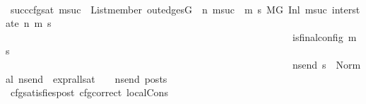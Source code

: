 \begin{isabellebody}
\isanewline
\ \ \ \ \ \ \ \ \ \ \ \ \ \ \ \ \isamarkupfalse%
\ succ{\isacharunderscore}{\kern0pt}cfg{\isacharunderscore}{\kern0pt}sat{\isacharcolon}{\kern0pt}\ {\isachardoublequoteopen}{\isacharparenleft}{\kern0pt}{\isasymforall}msuc{}{\isachardot}{\kern0pt}\ \ List{\isachardot}{\kern0pt}member\ {\isacharparenleft}{\kern0pt}out{\isacharunderscore}{\kern0pt}edges{\isacharparenleft}{\kern0pt}G{\isacharparenright}{\kern0pt}\ {\isacharbang}{\kern0pt}\ n{\isacharparenright}{\kern0pt}\ msuc{}\ {\isasymlongrightarrow}\ {\isacharparenleft}{\kern0pt}{\isasymforall}m{\isacharprime}{\kern0pt}\ s{\isacharprime}{\kern0pt}{\isachardot}{\kern0pt}\ {\isacharparenleft}{\kern0pt}{\isacharparenleft}{\kern0pt}M{\isacharcomma}{\kern0pt}{\isasymLambda}{\isacharcomma}{\kern0pt}{\isasymGamma}{\isacharcomma}{\kern0pt}{\isasymOmega}{\isacharcomma}{\kern0pt}G\ {\isasymturnstile}{\isacharparenleft}{\kern0pt}Inl\ {\isacharparenleft}{\kern0pt}msuc{}{\isacharparenright}{\kern0pt}{\isacharcomma}{\kern0pt}\ inter{\isacharunderscore}{\kern0pt}state{\isacharparenright}{\kern0pt}\ {\isacharminus}{\kern0pt}n{\isasymrightarrow}{\isacharasterisk}{\kern0pt}\ {\isacharparenleft}{\kern0pt}m{\isacharprime}{\kern0pt}{\isacharcomma}{\kern0pt}\ s{\isacharprime}{\kern0pt}{\isacharparenright}{\kern0pt}{\isacharparenright}{\kern0pt}\ {\isasymlongrightarrow}\isanewline
\ \ \ \ \ \ \ \ \ \ \ \ \ \ \ \ \ \ \ \ \ \ \ \ \ \ \ \ \ \ \ \ \ \ \ \ \ \ \ \ \ \ \ \ \ \ \ \ \ \ \ \ \ \ \ \ \ \ is{\isacharunderscore}{\kern0pt}final{\isacharunderscore}{\kern0pt}config\ {\isacharparenleft}{\kern0pt}m{\isacharprime}{\kern0pt}{\isacharcomma}{\kern0pt}\ s{\isacharprime}{\kern0pt}{\isacharparenright}{\kern0pt}\ {\isasymlongrightarrow}\ \isanewline
\ \ \ \ \ \ \ \ \ \ \ \ \ \ \ \ \ \ \ \ \ \ \ \ \ \ \ \ \ \ \ \ \ \ \ \ \ \ \ \ \ \ \ \ \ \ \ \ \ \ \ \ \ \ \ \ \ \ {\isacharparenleft}{\kern0pt}{\isasymforall}ns{\isacharunderscore}{\kern0pt}end{\isachardot}{\kern0pt}\ s{\isacharprime}{\kern0pt}\ {\isacharequal}{\kern0pt}\ Normal\ ns{\isacharunderscore}{\kern0pt}end\ {\isasymlongrightarrow}\ {\isacharparenleft}{\kern0pt}expr{\isacharunderscore}{\kern0pt}all{\isacharunderscore}{\kern0pt}sat\ {\isasymLambda}\ {\isasymGamma}\ {\isasymOmega}\ ns{\isacharunderscore}{\kern0pt}end{\isacharparenright}{\kern0pt}\ posts{\isacharparenright}{\kern0pt}{\isacharparenright}{\kern0pt}{\isacharparenright}{\kern0pt}{\isacharparenright}{\kern0pt}{\isachardoublequoteclose}\isanewline
\ \ \ \ \ \ \ \ \ \ \ \ \ \ \ \ \ \ \isamarkupfalse%
\ cfg{\isacharunderscore}{\kern0pt}satisfies{\isacharunderscore}{\kern0pt}post\ cfg{\isacharunderscore}{\kern0pt}correct\ local{\isachardot}{\kern0pt}Cons\isanewline

\end{isabellebody}
